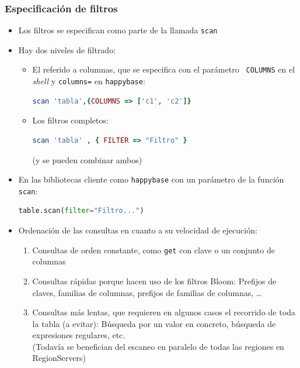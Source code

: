 \documentclass[14pt]{beamer}
\begin{document}
\begin{frame}
  \frametitle{Especificación de filtros}
\begin{itemize}
\item Los filtros se especifican como parte de la llamada {\tt scan}
\item Hay dos niveles de filtrado:
  \begin{itemize}
  \item El referido a columnas, que se especifica con el parámetro {\tt
      COLUMNS} en el {\em shell\/} y {\tt columns=} en {\tt happybase}:

\begin{lstlisting}[language=ruby]
scan 'tabla',{COLUMNS => ['c1', 'c2']}
\end{lstlisting}

  \item Los filtros completos:

\begin{lstlisting}[language=ruby]
scan 'tabla' , { FILTER => "Filtro" }
\end{lstlisting}

(y se pueden combinar ambos)
  \end{itemize}

\framebreak

\item En las bibliotecas cliente como {\tt happybase} con un parámetro de
  la función {\tt scan}:
\begin{lstlisting}[language=Python]
table.scan(filter="Filtro...")
\end{lstlisting}

\framebreak

\item Ordenación de las consultas en cuanto a su velocidad de ejecución:
  \begin{enumerate}
  \item Consultas de orden constante, como {\tt get} con clave o un
    conjunto de columnas
  \item Consultas rápidas porque hacen uso de los filtros Bloom: Prefijos
    de claves, familias de columnas, prefijos de familias de columnas,
    \ldots
  \item Consultas más lentas, que requieren en algunos casos el
    recorrido de toda la tabla (a evitar): Búsqueda por un valor en
    concreto, búsqueda de expresiones regulares, etc.\\
    (Todavía se benefician del escaneo en paralelo de todas las
    regiones en RegionServers)
  \end{enumerate}
\end{itemize}
\end{frame}
\end{document}
